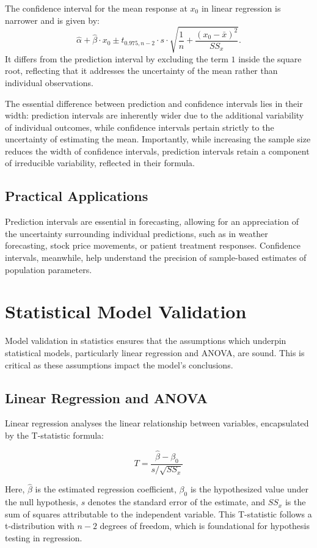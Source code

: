 \documentclass{article}
\begin{document}
The confidence interval for the mean response at $x_0$ in linear regression is narrower and is given by:
\[
\hat{\alpha} + \hat{\beta} \cdot x_0 \pm t_{0.975, n-2} \cdot s \cdot \sqrt{\frac{1}{n} + \frac{(x_0 - \bar{x})^2}{SS_x}}.
\]
It differs from the prediction interval by excluding the term $1$ inside the square root, reflecting that it addresses the uncertainty of the mean rather than individual observations.

The essential difference between prediction and confidence intervals lies in their width: prediction intervals are inherently wider due to the additional variability of individual outcomes, while confidence intervals pertain strictly to the uncertainty of estimating the mean. Importantly, while increasing the sample size reduces the width of confidence intervals, prediction intervals retain a component of irreducible variability, reflected in their formula.

\subsection{Practical Applications}
Prediction intervals are essential in forecasting, allowing for an appreciation of the uncertainty surrounding individual predictions, such as in weather forecasting, stock price movements, or patient treatment responses. Confidence intervals, meanwhile, help understand the precision of sample-based estimates of population parameters.

\section{Statistical Model Validation}

Model validation in statistics ensures that the assumptions which underpin statistical models, particularly linear regression and ANOVA, are sound. This is critical as these assumptions impact the model's conclusions.

\subsection{Linear Regression and ANOVA}
Linear regression analyses the linear relationship between variables, encapsulated by the T-statistic formula:

\[
T = \frac{\hat{\beta} - \beta_0}{s/\sqrt{SS_x}}
\]

Here, $\hat{\beta}$ is the estimated regression coefficient, $\beta_0$ is the hypothesized value under the null hypothesis, $s$ denotes the standard error of the estimate, and $SS_x$ is the sum of squares attributable to the independent variable. This T-statistic follows a t-distribution with $n-2$ degrees of freedom, which is foundational for hypothesis testing in regression.
\end{document}
